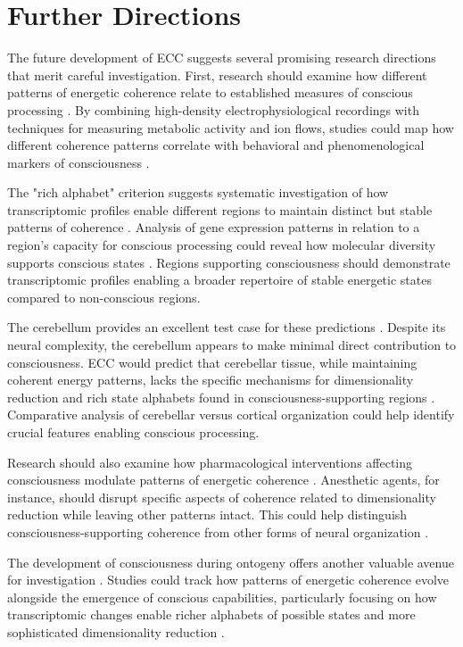 \section{Further Directions}

The future development of ECC suggests several promising research directions that merit careful investigation. First, research should examine how different patterns of energetic coherence relate to established measures of conscious processing \cite{seth2021being}. By combining high-density electrophysiological recordings with techniques for measuring metabolic activity and ion flows, studies could map how different coherence patterns correlate with behavioral and phenomenological markers of consciousness \cite{thompson2014waking}.

The "rich alphabet" criterion suggests systematic investigation of how transcriptomic profiles enable different regions to maintain distinct but stable patterns of coherence \cite{koch2019feeling}. Analysis of gene expression patterns in relation to a region's capacity for conscious processing could reveal how molecular diversity supports conscious states \cite{feinberg2016ancient}. Regions supporting consciousness should demonstrate transcriptomic profiles enabling a broader repertoire of stable energetic states compared to non-conscious regions.

The cerebellum provides an excellent test case for these predictions \cite{churchland2013touching}. Despite its neural complexity, the cerebellum appears to make minimal direct contribution to consciousness. ECC would predict that cerebellar tissue, while maintaining coherent energy patterns, lacks the specific mechanisms for dimensionality reduction and rich state alphabets found in consciousness-supporting regions \cite{varela2016embodied}. Comparative analysis of cerebellar versus cortical organization could help identify crucial features enabling conscious processing.

Research should also examine how pharmacological interventions affecting consciousness modulate patterns of energetic coherence \cite{chalmers2010character}. Anesthetic agents, for instance, should disrupt specific aspects of coherence related to dimensionality reduction while leaving other patterns intact. This could help distinguish consciousness-supporting coherence from other forms of neural organization \cite{noe2009out}.

The development of consciousness during ontogeny offers another valuable avenue for investigation \cite{goff2019galileo}. Studies could track how patterns of energetic coherence evolve alongside the emergence of conscious capabilities, particularly focusing on how transcriptomic changes enable richer alphabets of possible states and more sophisticated dimensionality reduction \cite{dennett2017bacteria}.

